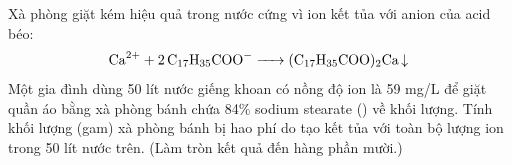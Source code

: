 \documentclass[11pt,a4paper]{article}
\begin{document}
\begin{ex}
Xà phòng giặt kém hiệu quả trong nước cứng vì ion  kết tủa với anion của acid béo:
$$\ce{Ca^2+ + 2C17H35COO^- -> (C17H35COO)2Ca v}$$
Một gia đình dùng 50 lít nước giếng khoan có nồng độ ion  là 59 mg/L để giặt quần áo bằng xà phòng bánh chứa 84\% sodium stearate () về khối lượng. Tính khối lượng (gam) xà phòng bánh bị hao phí do tạo kết tủa với toàn bộ lượng ion  trong 50 lít nước trên. (Làm tròn kết quả đến hàng phần mười.)
\end{ex}
\end{document}
